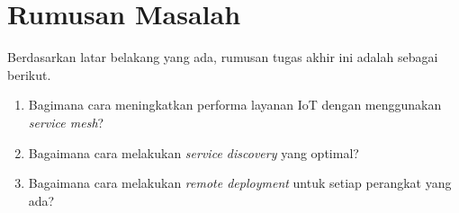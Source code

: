 \section{Rumusan Masalah}

Berdasarkan latar belakang yang ada, rumusan tugas akhir ini adalah sebagai berikut.
\begin{enumerate}
    \item Bagimana cara meningkatkan performa layanan IoT dengan menggunakan \textit{service mesh}?
    \item Bagaimana cara melakukan \textit{service discovery} yang optimal?
    \item Bagaimana cara melakukan \textit{remote deployment} untuk setiap perangkat yang ada?
\end{enumerate}